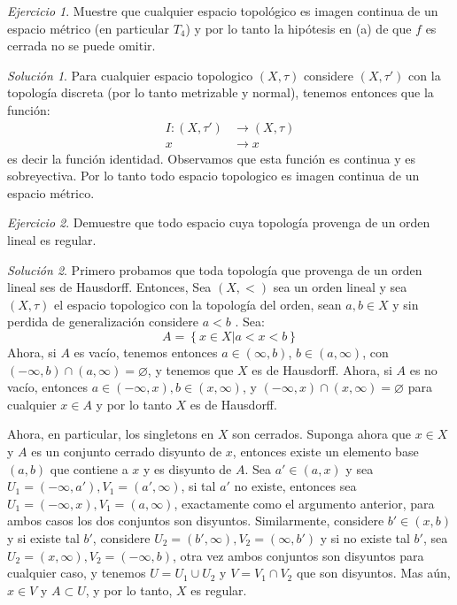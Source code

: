 \documentclass[notitlepage]{report}
\theoremstyle{definition}
\theoremstyle{remark}
\newtheorem{exc}{Ejercicio}
\newtheorem*{sol}{Solución}
\newcommand{\set}[1]{\left\lbrace #1 \right\rbrace}
\begin{document}
\begin{exc}
	Muestre que cualquier espacio topológico es imagen continua de un espacio métrico (en particular $ T_4 $) y por lo tanto la hipótesis en (a) de que $ f $ es cerrada no se puede omitir.
	
\end{exc}
\begin{sol}
	Para cualquier espacio topologico $ (X, \tau) $ considere $ (X,\tau') $ con la topología discreta (por lo tanto metrizable y normal), tenemos entonces que la función:
	\begin{align*}
	I: (X,\tau') &\rightarrow (X,\tau) \\
	x &\rightarrow x
	\end{align*}
	es decir la función identidad. Observamos que esta función es continua y es sobreyectiva. Por lo tanto todo espacio topologico es imagen continua de un espacio métrico.
\end{sol}
\begin{exc}
	Demuestre que todo espacio cuya topología provenga de un orden lineal es regular.
\end{exc}
\begin{sol}
	Primero probamos que toda topología que provenga de un orden lineal ses de Hausdorff. Entonces, Sea $  (X, < )$  sea un orden lineal y sea $ (X,\tau) $ el espacio topologico con la topología del orden, sean $ a,b \in X $ y sin perdida de generalización considere $ a < b $ . Sea:
	\[ A = \set{x \in X | a < x <b} \]
	Ahora, si $ A $ es vacío, tenemos entonces $ a \in ( \infty,b) $, $ b \in (a, \infty) $, con $ (-\infty,b) \cap (a, \infty) = \varnothing $, y tenemos que $ X $ es de Hausdorff. Ahora, si $ A $ es no vacío, entonces $ a \in (-\infty, x), b \in (x,\infty)$, y $ (-\infty, x) \cap (x,\infty) = \varnothing $ para cualquier $ x \in A $ y por lo tanto $ X $ es de Hausdorff.
	
	Ahora, en particular, los singletons en $ X $ son cerrados. Suponga ahora que $ x \in X $ y $ A $ es un conjunto cerrado disyunto de $ x $, entonces existe un elemento base $ (a,b) $ que contiene a $ x $ y es disyunto de $ A $. Sea $ a' \in (a,x) $ y sea $ U_1 = (-\infty,a'), V_1 = (a',\infty) $, si tal $ a' $ no existe, entonces sea $ U_1 = (-\infty,x), V_1 = (a,\infty)$, exactamente como el argumento anterior, para ambos casos los dos conjuntos son disyuntos. Similarmente, considere $ b' \in (x,b) $ y si existe tal $ b' $, considere $ U_2 = (b', \infty), V_2 = (\infty, b') $ y si no existe tal $ b' $, sea   $ U_2 = (x,\infty), V_2 = (-\infty,b)$, otra vez ambos conjuntos son disyuntos para cualquier caso, y tenemos $ U = U_1 \cup U_2 $ y $ V = V_1 \cap V_2 $ que son disyuntos. Mas aún, $ x \in V $ y $ A \subset U $, y por lo tanto, $ X $ es regular.
\end{sol}
\end{document}
